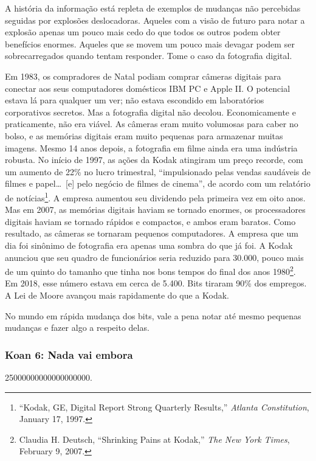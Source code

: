 A história da informação está repleta de exemplos de mudanças não percebidas 
seguidas por explosões deslocadoras. Aqueles com a visão de futuro para notar a 
explosão apenas um pouco mais cedo do que todos os outros podem obter benefícios 
enormes. Aqueles que se movem um pouco mais devagar podem ser sobrecarregados 
quando tentam responder. Tome o caso da fotografia digital.

Em 1983, os compradores de Natal podiam comprar câmeras digitais para conectar 
aos seus computadores domésticos IBM PC e Apple II. O potencial estava lá para 
qualquer um ver; não estava escondido em laboratórios corporativos secretos. Mas 
a fotografia digital não decolou. Economicamente e praticamente, não era viável.
As câmeras eram muito volumosas para caber no bolso, e as memórias digitais eram
muito pequenas para armazenar muitas imagens. Mesmo 14 anos depois, a fotografia
em filme ainda era uma indústria robusta. No início de 1997, as ações da Kodak
atingiram um preço recorde, com um aumento de 22\% no lucro trimestral, 
``impulsionado pelas vendas saudáveis de filmes e papel\ldots\ [e] pelo negócio
de filmes de cinema'', de acordo com um relatório de notícias\footnote{``Kodak,
GE, Digital Report Strong Quarterly Results,'' \textit{Atlanta Constitution},
January 17, 1997.}. A empresa aumentou seu dividendo pela primeira vez em oito
anos. Mas em 2007, as memórias digitais haviam se tornado enormes, os 
processadores digitais haviam se tornado rápidos e compactos, e ambos eram 
baratos. Como resultado, as câmeras se tornaram pequenos computadores. A empresa 
que um dia foi sinônimo de fotografia era apenas uma sombra do que já foi. A 
Kodak anunciou que seu quadro de funcionários seria reduzido para 30.000, pouco 
mais de um quinto do tamanho que tinha nos bons tempos do final dos anos
1980\footnote{Claudia H. Deutsch, ``Shrinking Pains at Kodak,'' \textit{The New
York Times}, February 9, 2007.}. Em 2018, esse número estava em cerca de 5.400.
Bits tiraram 90\% dos empregos. A Lei de Moore avançou mais rapidamente do que a
Kodak.

No mundo em rápida mudança dos bits, vale a pena notar até mesmo pequenas
mudanças e fazer algo a respeito delas.


\subsubsection*{Koan 6: Nada vai embora}
\label{cap1:exp-dig-koans:6}
\num{25000000000000000000}.

